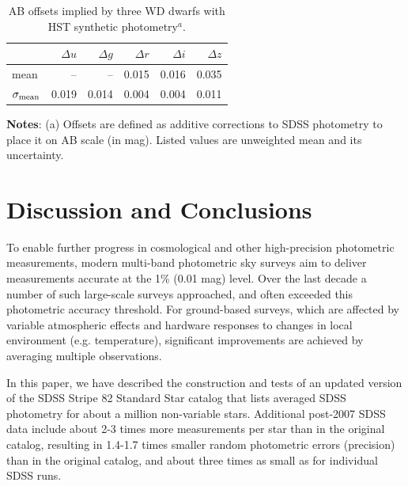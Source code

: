 \documentclass[fleqn,usenatbib]{mnras}
\begin{document}
\begin{table}
	\centering
	\caption{AB offsets implied by three WD dwarfs with HST synthetic photometry$^a$.}
	\label{tab:AB}
	\begin{tabular}{l|r|r|r|r|r} %
		\hline
		& $\Delta u$ & $\Delta g$ &$\Delta r$ &$\Delta i$ &$\Delta z$ \\
		\hline
  		 {\rm mean}            &    --     &        --     &      0.015    &       0.016    &      0.035     \\ 
  		$\sigma_{\rm mean}$ &         0.019    &        0.014     &      0.004    &       0.004    &      0.011     \\
		\hline
	\end{tabular}
     \vspace{1ex}

     {\raggedright {\bf Notes}: (a) Offsets are defined as additive corrections to SDSS photometry to place it on AB scale (in mag). Listed values are unweighted mean and its uncertainty. \par}
\end{table}


\section{Discussion and Conclusions} \label{sec:disc}

To enable further progress in cosmological and other high-precision photometric measurements, 
modern multi-band photometric sky surveys aim to deliver measurements accurate at the 1\% 
(0.01 mag) level. Over the last decade a number of such large-scale surveys approached, and
often exceeded this photometric accuracy threshold. For ground-based surveys, which are 
affected by variable atmospheric effects and hardware responses to changes in local environment
(e.g. temperature), significant improvements are achieved by averaging multiple observations. 

In this paper, we have described the construction and tests of an updated version of the
SDSS Stripe 82 Standard Star catalog \citep{Ivez07} that lists averaged SDSS photometry for about
a million non-variable stars. Additional post-2007 SDSS data include about 
2-3 times more measurements per star than in the original catalog, resulting in 1.4-1.7 times smaller 
random photometric errors (precision) than in the original catalog, and about three times as small 
as for individual SDSS runs.
\end{document}

